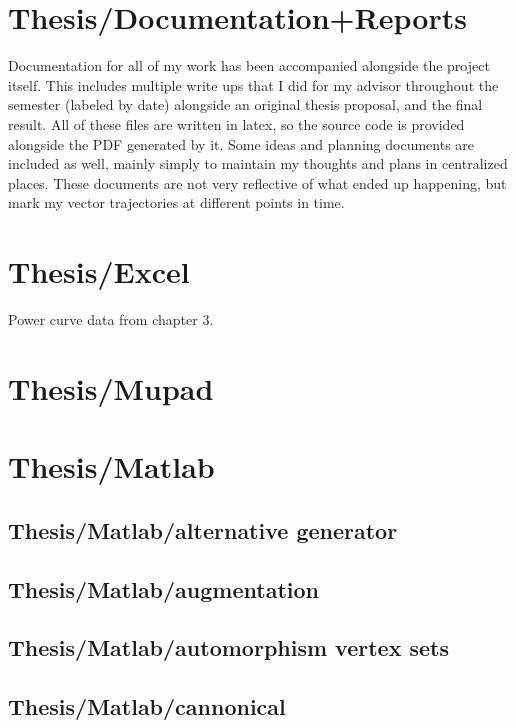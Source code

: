 \section*{Thesis/Documentation+Reports}

Documentation for all of my work has been accompanied alongside the project itself.
This includes multiple write ups that I did for my advisor throughout the semester (labeled by date) alongside an original thesis proposal, and the final result.
All of these files are written in latex, so the source code is provided alongside the PDF generated by it. 
Some ideas and planning documents are included as well, mainly simply to maintain my thoughts and plans in centralized places.
These documents are not very reflective of what ended up happening, but mark my vector trajectories at different points in time.

\section*{Thesis/Excel}

Power curve data from chapter 3.

\section*{Thesis/Mupad}

\section*{Thesis/Matlab}

\subsection*{Thesis/Matlab/alternative generator}

\subsection*{Thesis/Matlab/augmentation}

\subsection*{Thesis/Matlab/automorphism vertex sets}

\subsection*{Thesis/Matlab/cannonical}

